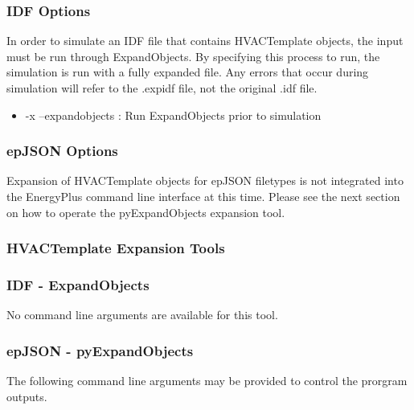 \subsubsection*{IDF Options}

In order to simulate an IDF file that contains HVACTemplate objects, the input must be run through ExpandObjects.  By specifying this process to run, the simulation is run with a fully expanded file.  Any errors that occur during simulation will refer to the \*.expidf file, not the original \*.idf file.

\begin{itemize}
  
\item
  -x --expandobjects : Run ExpandObjects prior to simulation

\end{itemize}

\subsubsection*{epJSON Options}

Expansion of HVACTemplate objects for epJSON filetypes is not integrated into the EnergyPlus command line interface at this time.  Please see the next section on how to operate the pyExpandObjects expansion tool.

\subsubsection{HVACTemplate Expansion Tools}

\subsubsection*{IDF - ExpandObjects}

No command line arguments are available for this tool.

\subsubsection*{epJSON - pyExpandObjects}

The following command line arguments may be provided to control the prorgram outputs.

